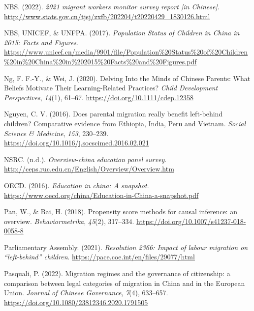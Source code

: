 \documentclass[
  man,floatsintext]{apa7}
\newlength{\cslhangindent}
\newlength{\cslentryspacingunit} %
\newenvironment{CSLReferences}[2] %
 {%
  \setlength{\parindent}{0pt}
  \ifodd #1
  \let\oldpar\par
  \def\par{\hangindent=\cslhangindent\oldpar}
  \fi
  \setlength{\parskip}{#2\cslentryspacingunit}
 }%
 {}
\begin{document}
\begin{CSLReferences}{1}{0}
\leavevmode{}%
NBS. (2022). \emph{2021 migrant workers monitor survey report {[}in Chinese{]}}. \url{http://www.stats.gov.cn/tjsj/zxfb/202204/t20220429_1830126.html}

\leavevmode{}%
NBS, UNICEF, \& UNFPA. (2017). \emph{Population Status of Children in China in 2015: Facts and Figures}. \url{https://www.unicef.cn/media/9901/file/Population\%20Status\%20of\%20Children\%20in\%20China\%20in\%202015\%20Facts\%20and\%20Figures.pdf}

\leavevmode{}%
Ng, F. F.-Y., \& Wei, J. (2020). Delving Into the Minds of Chinese Parents: What Beliefs Motivate Their Learning-Related Practices? \emph{Child Development Perspectives}, \emph{14}(1), 61--67. \url{https://doi.org/10.1111/cdep.12358}

\leavevmode{}%
Nguyen, C. V. (2016). Does parental migration really benefit left-behind children? Comparative evidence from Ethiopia, India, Peru and Vietnam. \emph{Social Science \& Medicine}, \emph{153}, 230--239. \url{https://doi.org/10.1016/j.socscimed.2016.02.021}

\leavevmode{}%
NSRC. (n.d.). \emph{Overview-china education panel survey}. \url{http://ceps.ruc.edu.cn/English/Overview/Overview.htm}

\leavevmode{}%
OECD. (2016). \emph{Education in china: A snapshot}. \url{https://www.oecd.org/china/Education-in-China-a-snapshot.pdf}

\leavevmode{}%
Pan, W., \& Bai, H. (2018). Propensity score methods for causal inference: an overview. \emph{Behaviormetrika}, \emph{45}(2), 317--334. \url{https://doi.org/10.1007/s41237-018-0058-8}

\leavevmode{}%
Parliamentary Assembly. (2021). \emph{Resolution 2366: Impact of labour migration on {``}left-behind{''} children}. \url{https://pace.coe.int/en/files/29077/html}

\leavevmode{}%
Pasquali, P. (2022). Migration regimes and the governance of citizenship: a comparison between legal categories of migration in China and in the European Union. \emph{Journal of Chinese Governance}, \emph{7}(4), 633--657. \url{https://doi.org/10.1080/23812346.2020.1791505}


\end{CSLReferences}
\end{document}
